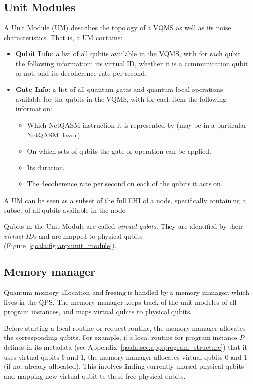 \subsection{Unit Modules}
A Unit Module (UM) describes the topology of a VQMS as well as its noise characteristics.
That is, a UM contains:
\begin{itemize}
\item \textbf{Qubit Info}: a list of all qubits available in the VQMS, with for each qubit the following information:
its virtual ID,
whether it is a communication qubit or not, and
its decoherence rate per second.

\item \textbf{Gate Info}: a list of all quantum gates and quantum local operations available for the qubits in the VQMS, with for each item the following information:
\begin{itemize}
  \item Which NetQASM instruction it is represented by (may be in a particular NetQASM flavor).
  \item On which sets of qubits the gate or operation can be applied.
  \item Its duration.
  \item The decoherence rate per second on each of the qubits it acts on.
\end{itemize}
\end{itemize}

A UM can be seen as a subset of the full EHI of a node, specifically containing a subset of all qubits available in the node.

Qubits in the Unit Module are called \textit{virtual qubits}. They are identified by their \textit{virtual IDs} and are mapped to physical qubits (Figure~\ref{qoala:fig:app:unit_module}).



\subsection{Memory manager}
Quantum memory allocation and freeing is handled by a memory manager, which lives in the QPS.
The memory manager keeps track of the unit modules of all program instances, and maps virtual qubits to physical qubits. 

Before starting a local routine or request routine, the memory manager allocates the corresponding qubits.
For example, if a local routine for program instance $P$ defines in its metadata (see Appendix~\ref{qoala:sec:app:program_structure}) that it uses virtual qubits 0 and 1, the memory manager allocates virtual qubits 0 and 1 (if not already allocated).
This involves finding currently unused physical qubits and mapping new virtual qubit to these free physical qubits.

